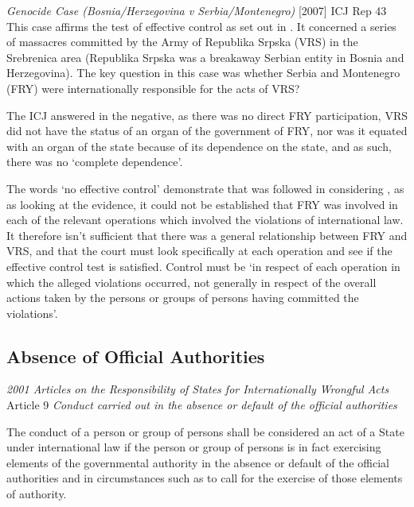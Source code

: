 \begin{casedetails}{\textit{Genocide Case (Bosnia/Herzegovina v Serbia/Montenegro)} [2007] ICJ Rep 43}
    \flushleft
    This case affirms the test of effective control as set out in . It concerned a series of massacres committed by the Army of Republika Srpska (VRS) in the Srebrenica area (Republika Srpska was a breakaway Serbian entity in Bosnia and Herzegovina). The key question in this case was whether Serbia and Montenegro (FRY) were internationally responsible for the acts of VRS? 
    
    \vspace{\baselineskip}
    
    The ICJ answered in the negative, as there was no direct FRY participation, VRS did not have the status of an organ of the government of FRY, nor was it equated with an organ of the state because of its dependence on the state, and as such, there was no `complete dependence'. 

    \vspace{\baselineskip}

    The words `no effective control' demonstrate that  was followed in considering , as as looking at the evidence, it could not be established that FRY was involved in each of the relevant operations which involved the violations of international law. It therefore isn't sufficient that there was a general relationship between FRY and VRS, and that the court must look specifically at each operation and see if the effective control test is satisfied. Control must be `in respect of each operation in which the alleged violations occurred, not generally in respect of the overall actions taken by the persons or groups of persons having committed the violations'.

\end{casedetails}

\subsection{Absence of Official Authorities}

\begin{conventiondetails}{\textit{2001 Articles on the Responsibility of States for Internationally Wrongful Acts} Article 9}
    \flushleft
    \textit{Conduct carried out in the absence or default of the official authorities}

    \vspace{\baselineskip}

    The conduct of a person or group of persons shall be considered an act of a State under international law if the person or group of persons is in fact exercising elements of the governmental authority in the absence or default of the official authorities and in circumstances such as to call for the exercise of those elements of authority.
\end{conventiondetails}

